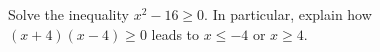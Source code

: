 Solve the inequality $x^2-16\ge0$. In particular, explain how $(x+4)(x-4)\ge0$ leads to $x\le-4$ or $x\ge4$.
